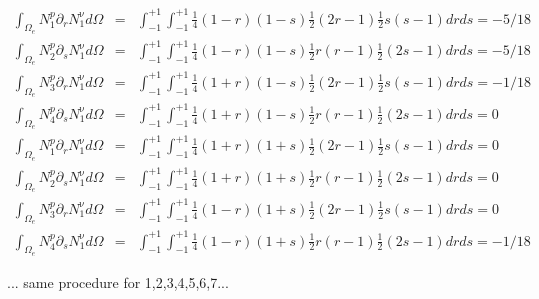 \begin{tiny}

\begin{eqnarray}
\int_{\Omega_e}  N_1^p \partial_r N_1^\upnu d\Omega &=&  
\int_{-1}^{+1}\int_{-1}^{+1}\frac{1}{4}(1-r)(1-s) \frac{1}{2}(2r-1) \frac{1}{2}s(s-1) dr ds = -5/18 \\
\int_{\Omega_e}  N_2^p \partial_s N_1^\upnu d\Omega &=&  
\int_{-1}^{+1}\int_{-1}^{+1}\frac{1}{4}(1-r)(1-s) \frac{1}{2}r(r-1) \frac{1}{2}(2s-1) dr ds = -5/18 \\
\int_{\Omega_e}  N_3^p \partial_r N_1^\upnu d\Omega &=&  
\int_{-1}^{+1}\int_{-1}^{+1}\frac{1}{4}(1+r)(1-s) \frac{1}{2}(2r-1) \frac{1}{2}s(s-1) dr ds = -1/18 \\
\int_{\Omega_e}  N_4^p \partial_s N_1^\upnu d\Omega &=&  
\int_{-1}^{+1}\int_{-1}^{+1}\frac{1}{4}(1+r)(1-s) \frac{1}{2}r(r-1) \frac{1}{2}(2s-1) dr ds = 0 \\
\int_{\Omega_e}  N_1^p \partial_r N_1^\upnu d\Omega &=&  
\int_{-1}^{+1}\int_{-1}^{+1}\frac{1}{4}(1+r)(1+s) \frac{1}{2}(2r-1) \frac{1}{2}s(s-1) dr ds = 0 \\
\int_{\Omega_e}  N_2^p \partial_s N_1^\upnu d\Omega &=&  
\int_{-1}^{+1}\int_{-1}^{+1}\frac{1}{4}(1+r)(1+s) \frac{1}{2}r(r-1) \frac{1}{2}(2s-1) dr ds = 0 \\
\int_{\Omega_e}  N_3^p \partial_r N_1^\upnu d\Omega &=&  
\int_{-1}^{+1}\int_{-1}^{+1}\frac{1}{4}(1-r)(1+s) \frac{1}{2}(2r-1) \frac{1}{2}s(s-1) dr ds = 0 \\
\int_{\Omega_e}  N_4^p \partial_s N_1^\upnu d\Omega &=&  
\int_{-1}^{+1}\int_{-1}^{+1}\frac{1}{4}(1-r)(1+s) \frac{1}{2}r(r-1) \frac{1}{2}(2s-1) dr ds = -1/18
\end{eqnarray}

... same procedure for 1,2,3,4,5,6,7...


\end{tiny}
